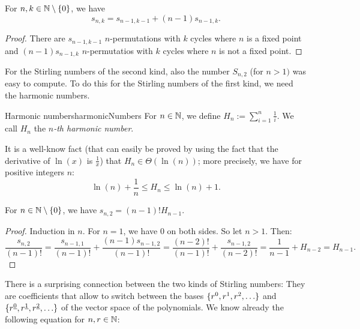 \documentclass[language=english]{../../Template/TemplateLecture}
\begin{document}
\begin{prop}
    For $n, k \in \mathbb{N} \setminus \{0\}$, we have 
    \begin{equation}
        s_{n,k} = s_{n-1,k-1} + (n-1)s_{n-1,k}.
    \end{equation}
\end{prop}

\begin{proof}
    There are $s_{n-1,k-1}$ $n$-permutations with $k$ cycles where $n$ is a fixed point and $(n-1)s_{n-1,k}$ $n$-permutatios with $k$ cycles where $n$ is not a fixed point.
\end{proof}

For the Stirling numbers of the second kind, also the number $S_{n,2}$ (for $n > 1)$ was easy to compute. To do this for the Stirling numbers of the first kind, we need the harmonic numbers.

\begin{defi}{Harmonic numbers}{harmonicNumbers}
    For $n \in \mathbb{N}$, we define $H_n := \sum_{i = 1}^n \frac{1}{i}$. We call $H_n$ the \emph{$n$-th harmonic number}.
\end{defi}

It is a well-know fact (that can easily be proved by using the fact that the derivative of $\ln(x)$ is $\frac{1}{x}$) that $H_n \in \Theta(\ln(n))$; more precisely, we have for positive integers $n$:
\begin{equation}
    \ln(n) + \frac{1}{n} \leq H_n \leq \ln(n) + 1.
\end{equation}

\begin{prop}
    For $n \in \mathbb{N} \setminus \{0\}$, we have $s_{n,2} = (n-1)! H_{n-1}$.
\end{prop}

\begin{proof}
    Induction in $n$. For $n = 1$, we have $0$ on both sides. So let $n > 1$. Then:
    \begin{equation}
        \frac{s_{n,2}}{(n-1)!} = \frac{s_{n-1,1}}{(n-1)!} + \frac{(n-1)s_{n-1,2}}{(n-1)!} = \frac{(n-2)!}{(n-1)!} + \frac{s_{n-1,2}}{(n-2)!} = \frac{1}{n-1} + H_{n-2} = H_{n-1}.
    \end{equation}
\end{proof}

There is a surprising connection between the two kinds of Stirling numbers: They are coefficients that allow to switch between the bases $\{r^0, r^1, r^2, \ldots\}$ and $\{r^{\underline{0}}, r^{\underline{1}}, r^{\underline{2}}, \ldots\}$ of the vector space of the polynomials. We know already the following equation for $n, r \in \mathbb{N}$:
\end{document}

